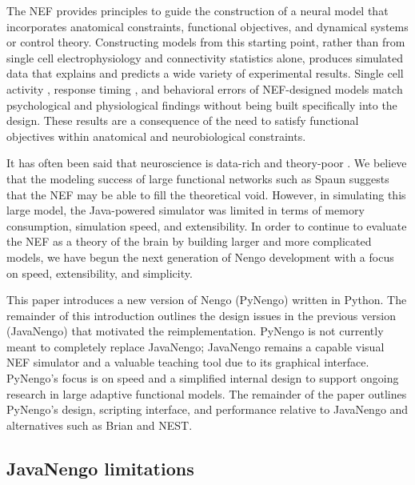 \documentclass{frontiersSCNS}
\begin{document}
The NEF provides principles
to guide the construction of
a neural model
that incorporates anatomical constraints,
functional objectives, and
dynamical systems or control theory.
Constructing models from this starting point,
rather than from single cell electrophysiology
and connectivity statistics alone,
produces simulated data that explains
and predicts a wide variety of experimental results.
Single cell activity \citep{stewart2012},
response timing \citep{stewart2009a},
and behavioral errors \citep{choo2010}
of NEF-designed models match
psychological and physiological findings
without being built specifically into the design.
These results are a consequence of
the need to satisfy functional objectives
within anatomical and neurobiological constraints.

It has often been said that neuroscience
is data-rich and theory-poor \citep{churchland1992}.
We believe that the modeling success of
large functional networks such as Spaun
suggests that the NEF
may be able to fill the theoretical void.
However, in simulating this large model,
the Java-powered simulator
was limited in terms of memory consumption,
simulation speed, and extensibility.
In order to continue to evaluate the NEF
as a theory of the brain
by building larger and more complicated models,
we have begun the next generation
of Nengo development with a focus on speed,
extensibility, and simplicity.

This paper introduces a new version
of Nengo (PyNengo) written in Python.
The remainder of this introduction outlines
the design issues in the previous version (JavaNengo)
that motivated the reimplementation.
PyNengo is not currently meant
to completely replace JavaNengo;
JavaNengo remains a capable visual NEF
simulator and a valuable teaching tool
due to its graphical interface.
PyNengo's focus is on speed
and a simplified internal design
to support ongoing research in
large adaptive functional models.
The remainder of the paper outlines PyNengo's design,
scripting interface, and performance relative to
JavaNengo and alternatives such as Brian and NEST.

\subsection{JavaNengo limitations}
\end{document}
